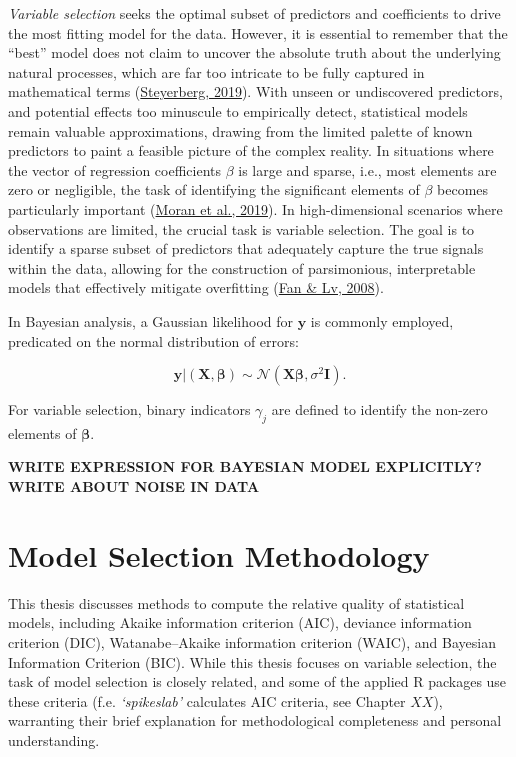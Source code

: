 \documentclass[
  11pt,
]{article}
\begin{document}
\emph{Variable selection} seeks the optimal subset of predictors and
coefficients to drive the most fitting model for the data. However, it
is essential to remember that the ``best'' model does not claim to
uncover the absolute truth about the underlying natural processes, which
are far too intricate to be fully captured in mathematical terms
(\protect\hyperlink{ref-Ewout2019}{Steyerberg, 2019}). With unseen or
undiscovered predictors, and potential effects too minuscule to
empirically detect, statistical models remain valuable approximations,
drawing from the limited palette of known predictors to paint a feasible
picture of the complex reality. In situations where the vector of
regression coefficients \(\beta\) is large and sparse, i.e., most
elements are zero or negligible, the task of identifying the significant
elements of \(\beta\) becomes particularly important
(\protect\hyperlink{ref-Moran2019}{Moran et al., 2019}). In
high-dimensional scenarios where observations are limited, the crucial
task is variable selection. The goal is to identify a sparse subset of
predictors that adequately capture the true signals within the data,
allowing for the construction of parsimonious, interpretable models that
effectively mitigate overfitting (\protect\hyperlink{ref-Fan2008}{Fan \&
Lv, 2008}).

In Bayesian analysis, a Gaussian likelihood for \(\mathbf{y}\) is
commonly employed, predicated on the normal distribution of errors:

\begin{equation}
\mathbf{y} | (\mathbf{X}, \boldsymbol{\beta}) \sim \mathcal{N}(\mathbf{X}\boldsymbol{\beta}, \sigma^2\mathbf{I}).
\end{equation}

For variable selection, binary indicators \(\gamma_j\) are defined to
identify the non-zero elements of \(\boldsymbol{\beta}\).

\textbf{WRITE EXPRESSION FOR BAYESIAN MODEL EXPLICITLY?} \textbf{WRITE
ABOUT NOISE IN DATA}

\newpage

\section{Model Selection Methodology}

This thesis discusses methods to compute the relative quality of
statistical models, including Akaike information criterion (AIC),
deviance information criterion (DIC), Watanabe--Akaike information
criterion (WAIC), and Bayesian Information Criterion (BIC). While this
thesis focuses on variable selection, the task of model selection is
closely related, and some of the applied R packages use these criteria
(f.e. \emph{`spikeslab'} calculates AIC criteria, see Chapter \(XX\)),
warranting their brief explanation for methodological completeness and
personal understanding.
\end{document}
